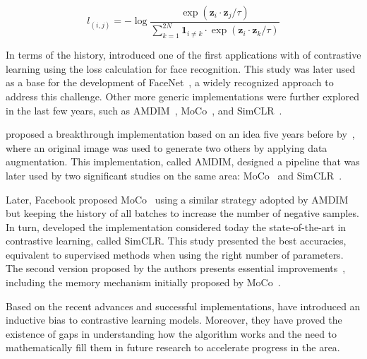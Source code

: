 \documentclass[12pt]{article}
\begin{document}
\begin{equation}
l_{(i,j)}=-\log{\frac{\exp{\left(\boldsymbol{z}_i\cdot\boldsymbol{z}_j/\tau\right)}}{\sum_{k=1}^{2N}\mathbf{1}_{i\neq k}\cdot\exp{\left(\boldsymbol{z}_i\cdot\boldsymbol{z}_k/\tau\right)}}}
\label{eqn:contrastive_learning}
\end{equation} 

\vspace{1.5em}

In terms of the history, \citet{chopra2005} introduced one of the first applications with  of contrastive learning using the loss calculation for face recognition. This study was later used as a base for the development of FaceNet~\citep{schroff2015}, a widely recognized approach to address this challenge. Other more generic implementations were further explored in the last few years, such as AMDIM~\citep{bachman2019}, MoCo~\citep{he2020}, and SimCLR~\citep{chen2020}.

\citet{bachman2019} proposed a breakthrough implementation based on an idea five years before by~\citet{dosovitskiy2016}, where an original image was used to generate two others by applying data augmentation. This implementation, called AMDIM, designed a pipeline that was later used by two significant studies on the same area: MoCo~\citep{he2020} and SimCLR~\citep{chen2020}.

Later, Facebook proposed MoCo~\citep{he2020} using a similar strategy adopted by AMDIM but keeping the history of all batches to increase the number of negative samples.
In turn, \citet{chen2020} developed the implementation considered today the state-of-the-art in contrastive learning, called SimCLR. This study presented the best accuracies, equivalent to supervised methods when using the right number of parameters. The second version proposed by the authors presents essential improvements~\citep{chen2020.2}, including the memory mechanism initially proposed by MoCo~\citep{he2020}.

Based on the recent advances and successful implementations, \citet{saunshi2022} have introduced an inductive bias to contrastive learning models. Moreover, they have proved the existence of gaps in understanding how the algorithm works and the need to mathematically fill them in future research to accelerate progress in the area.

\end{document}
